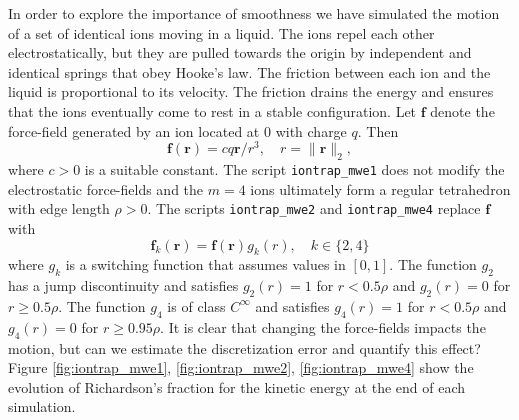 \documentclass[runningheads]{llncs}
\begin{document}
In order to explore the importance of smoothness we have simulated the motion of a set of identical ions moving in a liquid. The ions repel each other electrostatically, but they are pulled towards the origin by independent and identical springs that obey Hooke's law. The friction between each ion and the liquid is proportional to its velocity. The friction drains the energy and ensures that the ions eventually come to rest in a stable configuration. 
Let $\bm{f}$ denote the force-field generated by an ion located at $0$ with charge $q$. Then
\begin{equation}
  \bm{f}(\bm{r}) = c q \bm{r}/r^3, \quad r = \|\bm{r}\|_2,
\end{equation}
where $c > 0$ is a suitable constant. The script {\tt iontrap\_mwe1} does not modify the electrostatic force-fields and the $m=4$ ions ultimately form a regular tetrahedron with edge length $\rho > 0$.
The scripts {\tt iontrap\_mwe2} and {\tt iontrap\_mwe4} replace $\bm{f}$ with
\begin{equation}
\bm{f}_k(\bm{r}) = \bm{f}(\bm{r}) g_k(r), \quad k \in \{2, 4\}
\end{equation}
where $g_k$ is a switching function that assumes values in $[0,1]$. The function $g_2$ has a jump discontinuity and satisfies $g_2(r) = 1$ for $r < 0.5 \rho$ and $g_2(r) = 0$ for $r \ge 0.5 \rho$. The function $g_4$ is of class $C^\infty$ and satisfies $g_4(r) = 1$ for $r < 0.5 \rho$ and $g_4(r) = 0$ for $r \ge 0.95 \rho$. It is clear that changing the force-fields impacts the motion, but can we estimate the discretization error and quantify this effect? Figure \ref{fig:iontrap_mwe1}, \ref{fig:iontrap_mwe2}, \ref{fig:iontrap_mwe4} show the evolution of Richardson's fraction for the kinetic energy at the end of each simulation.
\end{document}
